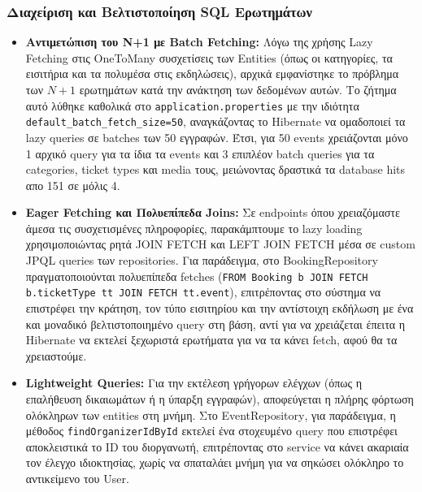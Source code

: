 \documentclass[12pt]{fphw}
\newcommand{\en}[1]{\foreignlanguage{english}{#1}}
\begin{document}
\subsubsection{Διαχείριση και Βελτιστοποίηση SQL Ερωτημάτων}
\begin{itemize}[leftmargin=*]
    \item \textbf{Αντιμετώπιση του N+1 με Batch Fetching:} Λόγω της χρήσης \en{Lazy Fetching} στις \en{OneToMany} συσχετίσεις των \en{Entities} (όπως οι κατηγορίες, τα εισιτήρια και τα πολυμέσα στις εκδηλώσεις), αρχικά εμφανίστηκε το πρόβλημα των $N+1$ ερωτημάτων κατά την ανάκτηση των δεδομένων αυτών. Το ζήτημα αυτό λύθηκε καθολικά στο \en{\texttt{application.properties}} με την ιδιότητα \en{\texttt{default\_batch\_fetch\_size=50}}, αναγκάζοντας το \en{Hibernate} να ομαδοποιεί τα lazy queries σε batches των 50 εγγραφών. Έτσι, για 50 events χρειάζονται μόνο 1 αρχικό query για τα ίδια τα events και 3 επιπλέον batch queries για τα categories, ticket types και media τους, μειώνοντας δραστικά τα database hits απο 151 σε μόλις 4.
    \item \textbf{Eager Fetching και Πολυεπίπεδα Joins:} Σε endpoints όπου χρειαζόμαστε άμεσα τις συσχετισμένες πληροφορίες, παρακάμπτουμε το lazy loading χρησιμοποιώντας ρητά \en{JOIN FETCH} και \en{LEFT JOIN FETCH} μέσα σε custom JPQL queries των repositories. Για παράδειγμα, στο \en{BookingRepository} πραγματοποιούνται πολυεπίπεδα fetches (\en{\texttt{FROM Booking b JOIN FETCH b.ticketType tt JOIN FETCH tt.event}}), επιτρέποντας στο σύστημα να επιστρέφει την κράτηση, τον τύπο εισιτηρίου και την αντίστοιχη εκδήλωση με ένα και μοναδικό βελτιστοποιημένο query στη βάση, αντί για να χρειάζεται έπειτα η Hibernate να εκτελεί ξεχωριστά ερωτήματα για να τα κάνει fetch, αφού θα τα χρειαστούμε.
    \item \textbf{Lightweight Queries:} Για την εκτέλεση γρήγορων ελέγχων (όπως η επαλήθευση δικαιωμάτων ή η ύπαρξη εγγραφών), αποφεύγεται η πλήρης φόρτωση ολόκληρων των entities στη μνήμη. Στο \en{EventRepository}, για παράδειγμα, η μέθοδος \en{\texttt{findOrganizerIdById}} εκτελεί ένα στοχευμένο query που επιστρέφει αποκλειστικά το \en{ID} του διοργανωτή, επιτρέποντας στο service να κάνει ακαριαία τον έλεγχο ιδιοκτησίας, χωρίς να σπαταλάει μνήμη για να σηκώσει ολόκληρο το αντικείμενο του \en{User}.
\end{itemize}
\end{document}
